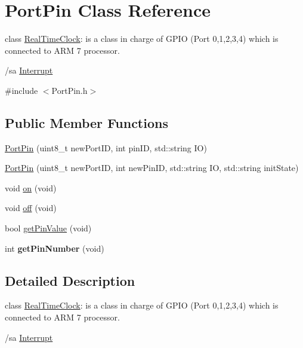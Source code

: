 \hypertarget{class_port_pin}{
\section{PortPin Class Reference}
\label{class_port_pin}
}


class \hyperlink{class_real_time_clock}{RealTimeClock}: is a class in charge of GPIO (Port 0,1,2,3,4) which is connected to ARM 7 processor.

/sa \hyperlink{class_interrupt}{Interrupt}  




{\ttfamily \#include $<$PortPin.h$>$}

\subsection*{Public Member Functions}
\begin{DoxyCompactItemize}
\item 
\hyperlink{class_port_pin_a8dc8b07b5dd2d33c07f9fc8218bd37fe}{PortPin} (uint8\_\-t newPortID, int pinID, std::string IO)
\item 
\hyperlink{group__group7_gae4b6c1ca5935d5e3d68253490cae00a8}{PortPin} (uint8\_\-t newPortID, int newPinID, std::string IO, std::string initState)
\item 
void \hyperlink{group__group7_ga7dfeaef858c6fadac016106aac028278}{on} (void)
\item 
void \hyperlink{group__group7_ga779ca8e89b76bff26659244a4e4888a7}{off} (void)
\item 
bool \hyperlink{group__group7_gabc0f706193ead5769118388757374e85}{getPinValue} (void)
\item 
\hypertarget{group__group7_ga965a0cef4266fee8909e7b5998b1bae8}{
int {\bfseries getPinNumber} (void)}
\label{group__group7_ga965a0cef4266fee8909e7b5998b1bae8}

\end{DoxyCompactItemize}


\subsection{Detailed Description}
class \hyperlink{class_real_time_clock}{RealTimeClock}: is a class in charge of GPIO (Port 0,1,2,3,4) which is connected to ARM 7 processor.

/sa \hyperlink{class_interrupt}{Interrupt} 

